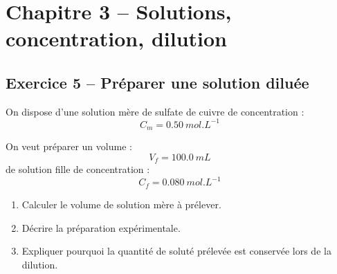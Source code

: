 \documentclass[11pt,a4paper]{article}
\begin{document}
\section{Chapitre 3 -- Solutions, concentration, dilution}

\subsection{Exercice 5 -- Préparer une solution diluée}

\begin{enoncebox}
On dispose d'une solution mère de sulfate de cuivre de concentration :
\[
C_m = \SI{0.50}{mol.L^{-1}}
\]

On veut préparer un volume :
\[
V_f = \SI{100.0}{mL}
\]
de solution fille de concentration :
\[
C_f = \SI{0.080}{mol.L^{-1}}
\]

\begin{enumerate}[label=\arabic*)]
    \item Calculer le volume de solution mère à prélever.
    \item Décrire la préparation expérimentale.
    \item Expliquer pourquoi la quantité de soluté prélevée est conservée lors de la dilution.
\end{enumerate}
\end{enoncebox}
\end{document}

